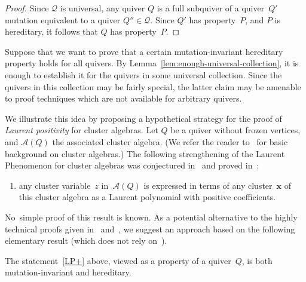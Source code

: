 \documentclass[ALCO,ThmDefs,Unicode,epreuves,published]{cedram}
\begin{document}
\begin{proof}
Since $\mathcal{Q}$ is universal, 
any quiver $Q$ is a full subquiver of a quiver~$Q'$ 
mutation equivalent to a quiver $Q''\in\mathcal{Q}$. 
Since $Q'$ has property~$P$, and $P$ is hereditary, it follows that $Q$ has property~$P$. 
\end{proof}
 
Suppose that we want to prove that a certain mutation-invariant hereditary property holds for all quivers. By Lemma~\ref{lem:enough-universal-collection}, it is enough to establish it for the quivers in some universal collection. 
Since the quivers in this collection may be fairly special, the latter claim may be amenable to proof techniques which are not available for arbitrary quivers. 


We illustrate this idea by proposing a hypothetical strategy for the proof of \emph{Laurent positivity} for cluster algebras. 
Let $Q$ be a quiver without frozen vertices, and $\mathcal{A}(Q)$ the associated cluster algebra. (We refer the reader to~\cite{FWZ} for basic background on cluster algebras.) 
The following strengthening of the Laurent Phenomenon for cluster algebras 
was conjectured in~\cite{ca1} and proved in~\cite{GHKK,lee-schiffler}: 
\begin{enumerate}[label=(LP+)]
\item\label{LP+} %
any cluster variable~$z$ in~$\mathcal{A}(Q)$ is expressed in terms of any cluster~$\mathbf{x}$ of this cluster algebra as a Laurent polynomial with positive coefficients. 
\end{enumerate}
No~simple proof of this result is known. As a potential alternative to the highly technical proofs given in~\cite{GHKK} and~\cite{lee-schiffler}, we suggest an approach based on the following elementary result (which does not rely on~\cite{GHKK,lee-schiffler}). 

\begin{lemma}
\label{lem:laurent-positivity-is-hereditary}
The statement~\ref{LP+} above, viewed as a property of a quiver~$Q$, is both mutation-invariant and hereditary. 
\end{lemma}
\end{document}
